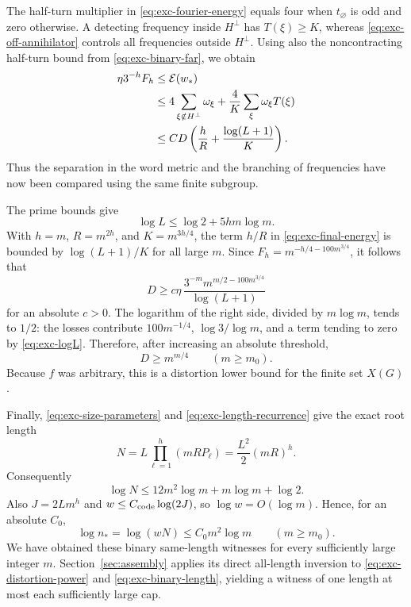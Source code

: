 The half-turn multiplier in \eqref{eq:exc-fourier-energy} equals four
when $t_{\varnothing}$ is odd and zero otherwise.  A detecting frequency
inside $H^\perp$ has $T(\xi)\ge K$, whereas
\eqref{eq:exc-off-annihilator} controls all frequencies outside
$H^\perp$.  Using also the noncontracting half-turn bound from
\eqref{eq:exc-binary-far}, we obtain
\begin{align}
 \eta3^{-h}F_h
 &\le \mathcal E(w_*) \notag\\
 &\le 4\sum_{\xi\notin H^\perp}\omega_\xi
       +\frac4K\sum_\xi\omega_\xi T(\xi) \notag\\
 &\le C D\left(\frac hR+\frac{\log(L+1)}K\right).
 \label{eq:exc-final-energy}
\end{align}
Thus the separation in the word metric and the branching of frequencies
have now been compared using the same finite subgroup.

The prime bounds give
\begin{equation}\label{eq:exc-logL}
 \log L\le\log2+5hm\log m.
\end{equation}
With $h=m$, $R=m^{2h}$, and $K=m^{3h/4}$, the term $h/R$ in
\eqref{eq:exc-final-energy} is bounded by $\log(L+1)/K$ for all large $m$.
Since $F_h=m^{-h/4-100m^{3/4}}$, it follows that
\begin{equation}\label{eq:exc-distortion-explicit}
 D\ge c\eta\,
       \frac{3^{-m}m^{m/2-100m^{3/4}}}{\log(L+1)}
\end{equation}
for an absolute $c>0$.  The logarithm of the right side, divided by
$m\log m$, tends to $1/2$: the losses contribute
$100m^{-1/4}$, $\log3/\log m$, and a term tending to zero by
\eqref{eq:exc-logL}.  Therefore, after increasing an absolute threshold,
\begin{equation}\label{eq:exc-distortion-power}
 D\ge m^{m/4}\qquad(m\ge m_0).
\end{equation}
Because $f$ was arbitrary, this is a distortion lower bound for the finite
set $X(G)$.

Finally, \eqref{eq:exc-size-parameters} and
\eqref{eq:exc-length-recurrence} give the exact root length
\[
 N=L\prod_{\ell=1}^h(mRP_\ell)
   =\frac{L^2}{2}(mR)^h.
\]
Consequently
\[
 \log N\le12m^2\log m+m\log m+\log2.
\]
Also $J=2Lm^h$ and $w\le C_{\rm code}\log(2J)$, so
$\log w=O(\log m)$.  Hence, for an absolute $C_0$,
\begin{equation}\label{eq:exc-binary-length}
 \log n_*=\log(wN)\le C_0m^2\log m
 \qquad(m\ge m_0).
\end{equation}
We have obtained these binary same-length witnesses for every sufficiently
large integer $m$.  Section~\ref{sec:assembly} applies its direct
all-length inversion to \eqref{eq:exc-distortion-power} and
\eqref{eq:exc-binary-length}, yielding a witness of one length at most
each sufficiently large cap.
